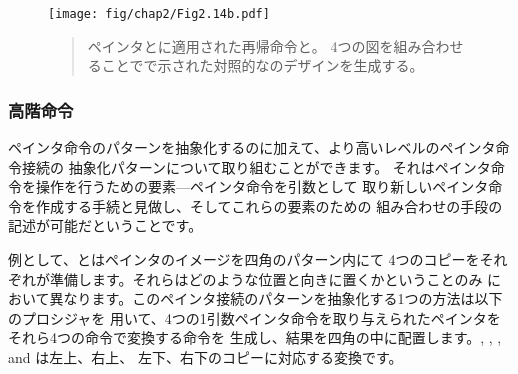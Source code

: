 \begin{figure}[tbp]
\label{Figure 2.14}
\centering
\begin{comment}
\heading{Figure 2.14:} The recursive operations \code{right\-/split} and \code{corner\-/split} applied to the painters \code{wave} and \code{rogers}.  Combining four \code{corner\-/split} figures produces symmetric \code{square\-/limit} designs as shown in \link{Figure 2.9}.

[two graphic images not included]

\begin{scheme}
(right-split wave 4)         (right-split rogers 4)
\end{scheme}

[two graphic images not included]

\begin{scheme}
(corner-split wave 4)        (corner-split rogers 4)
\end{scheme}
\end{comment}
\texttt{[image: fig/chap2/Fig2.14b.pdf]}
\begin{quote}
 ペインタとに適用された再帰命令と。
4つの図を組み合わせることでで示された対照的なのデザインを生成する。
\end{quote}
\end{figure}

\subsubsection*{高階命令}



ペインタ命令のパターンを抽象化するのに加えて、より高いレベルのペインタ命令接続の
抽象化パターンについて取り組むことができます。
それはペインタ命令を操作を行うための要素---ペインタ命令を引数として
取り新しいペインタ命令を作成する手続と見做し、そしてこれらの要素のための
組み合わせの手段の記述が可能だということです。



例として、とはペインタのイメージを四角のパターン内にて
4つのコピーをそれぞれが準備します。それらはどのような位置と向きに置くかということのみ
において異なります。このペインタ接続のパターンを抽象化する1つの方法は以下のプロシジャを
用いて、4つの1引数ペインタ命令を取り与えられたペインタをそれら4つの命令で変換する命令を
生成し、結果を四角の中に配置します。, , , and は左上、右上、
左下、右下のコピーに対応する変換です。


